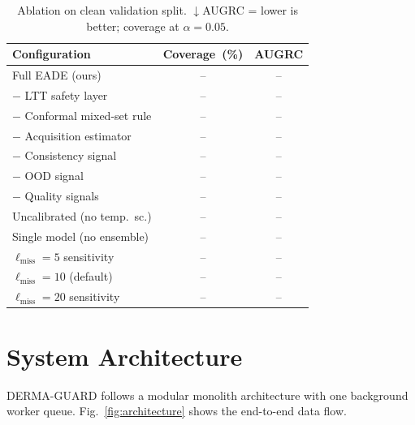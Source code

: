\documentclass[conference]{IEEEtran}
\newcommand{\1}{\mathbf{1}}
\begin{document}
\begin{table}[H]
  \centering
  \caption{%
    Ablation on clean validation split.
    $\downarrow$AUGRC = lower is better; coverage at $\alpha=0.05$.
  }
  \label{tab:ablations}
  \renewcommand{\arraystretch}{1.2}
  \small
  \begin{tabular}{lcc}
    \toprule
    \textbf{Configuration} & \textbf{Coverage~(\%)} & \textbf{AUGRC} \\
    \midrule
    Full EADE (ours)                    & -- & -- \\
    \quad$-$ LTT safety layer           & -- & -- \\
    \quad$-$ Conformal mixed-set rule   & -- & -- \\
    \quad$-$ Acquisition estimator      & -- & -- \\
    \quad$-$ Consistency signal         & -- & -- \\
    \quad$-$ OOD signal                 & -- & -- \\
    \quad$-$ Quality signals            & -- & -- \\
    \quad Uncalibrated (no temp.\ sc.)  & -- & -- \\
    \quad Single model (no ensemble)    & -- & -- \\
    \midrule
    $\ell_{\text{miss}}=5$ sensitivity  & -- & -- \\
    $\ell_{\text{miss}}=10$ (default)   & -- & -- \\
    $\ell_{\text{miss}}=20$ sensitivity & -- & -- \\
    \bottomrule
  \end{tabular}
\end{table}

\section{System Architecture}
\label{sec:architecture}

DERMA-GUARD follows a modular monolith architecture with one background
worker queue. Fig.~\ref{fig:architecture} shows the end-to-end data flow.
\end{document}
